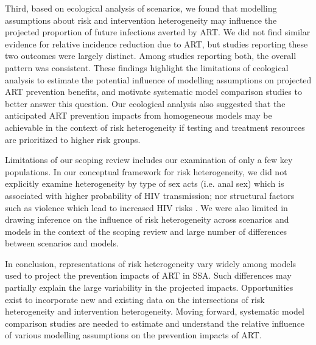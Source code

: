 \par %
Third, based on ecological analysis of scenarios, we found that
modelling assumptions about risk and intervention heterogeneity
may influence the projected proportion of future infections averted by ART.
We did not find similar evidence for relative incidence reduction due to ART,
but studies reporting these two outcomes were largely distinct.
Among studies reporting both, the overall pattern was consistent. %
These findings highlight the limitations of ecological analysis to estimate
the potential influence of modelling assumptions on projected ART prevention benefits,
and motivate systematic model comparison studies to better answer this question. %
Our ecological analysis also suggested that the anticipated ART prevention impacts from homogeneous models
may be achievable in the context of risk heterogeneity
if testing and treatment resources are prioritized to higher risk groups. 

\par %
Limitations of our scoping review includes our examination of only a few key populations.
In our conceptual framework for risk heterogeneity, we did not explicitly examine heterogeneity 
by type of sex acts (i.e. anal sex) which is associated with higher probability of HIV transmission; 
nor structural factors such as violence which lead to increased HIV risks \cite{Silverman2011,Baggaley2013}.
We were also limited in drawing inference on the influence of risk heterogeneity across scenarios and models in the context of the 
scoping review and large number of differences between scenarios and models.

\par
In conclusion, representations of risk heterogeneity vary widely  %
among models used to project the prevention impacts of ART in SSA.
Such differences may partially explain the large variability in the projected impacts.
Opportunities exist to incorporate new and existing data on
the intersections of risk heterogeneity and intervention heterogeneity.
Moving forward, systematic model comparison studies are needed to
estimate and understand the relative influence of various modelling assumptions on the prevention impacts of ART.
